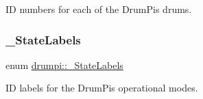 ID numbers for each of the Drum\+Pi\textquotesingle{}s drums. \mbox{\label{namespacedrumpi_a3b4ebb11c78873766e337e65d6597286}} 
\subsubsection{\texorpdfstring{\+\_\+\+State\+Labels}{\_StateLabels}}
{\footnotesize\ttfamily enum \hyperlink{namespacedrumpi_a3b4ebb11c78873766e337e65d6597286}{drumpi\+::\+\_\+\+State\+Labels}}

ID labels for the Drum\+Pi\textquotesingle{}s operational modes. 